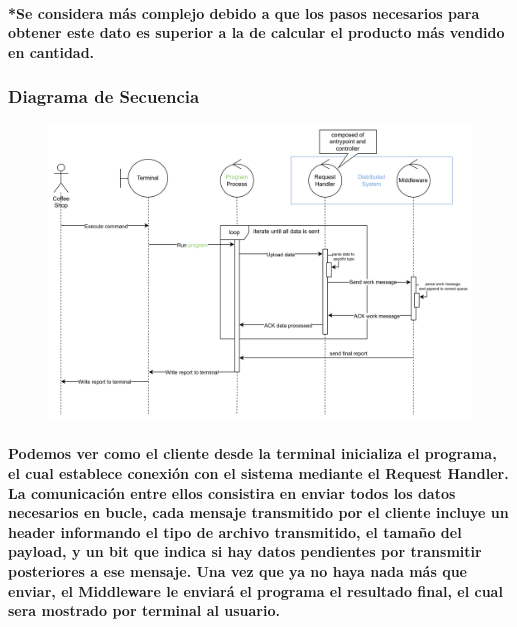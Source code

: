 \documentclass[titlepage,a4paper]{article}
\begin{document}
\paragraph{*Se considera más complejo debido a que los pasos necesarios para obtener este dato es superior a la de calcular el producto más vendido en cantidad.}

\subsubsection{Diagrama de Secuencia}

\begin{figure}[H]
    \centering
    \includegraphics[width=1\linewidth]{secuencia.png}
\end{figure}
\paragraph{Podemos ver como el cliente desde la terminal inicializa el programa, el cual establece conexión con el sistema mediante el Request Handler. La comunicación entre ellos consistira en enviar todos los datos necesarios en bucle, cada mensaje transmitido por el cliente incluye un header informando el tipo de archivo transmitido, el tamaño del payload, y un bit que indica si hay datos pendientes por transmitir posteriores a ese mensaje. Una vez que ya no haya nada más que enviar, el Middleware le enviará el programa el resultado final, el cual sera mostrado por terminal al usuario.}
\end{document}
